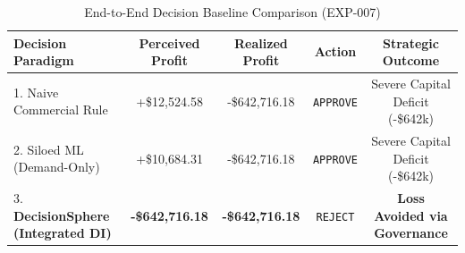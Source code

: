 \begin{table}[htbp]
\caption{End-to-End Decision Baseline Comparison (EXP-007)}
\begin{center}
\begin{tabular}{lcccc}
\toprule
\textbf{Decision Paradigm} & \textbf{Perceived Profit} & \textbf{Realized Profit} & \textbf{Action} & \textbf{Strategic Outcome} \\
\midrule
1. Naive Commercial Rule & +\$12,524.58 & -\$642,716.18 & \texttt{APPROVE} & Severe Capital Deficit (-\$642k) \\
2. Siloed ML (Demand-Only) & +\$10,684.31 & -\$642,716.18 & \texttt{APPROVE} & Severe Capital Deficit (-\$642k) \\
3. \textbf{DecisionSphere (Integrated DI)} & \textbf{-\$642,716.18} & \textbf{-\$642,716.18} & \texttt{REJECT} & \textbf{Loss Avoided via Governance} \\
\bottomrule
\end{tabular}
\label{tab:baseline_comparison}
\end{center}
\end{table}
